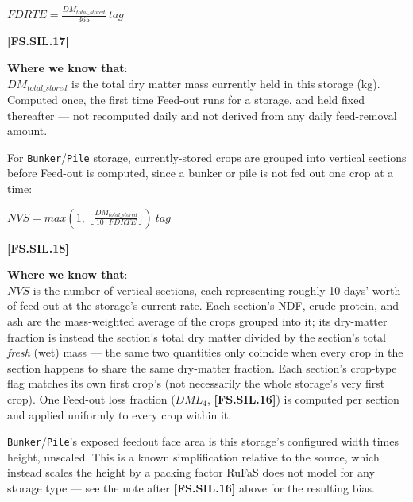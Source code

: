\begin{refsection}
        \begin{center}
        \(FDRTE = \frac{DM_{total\_stored}}{365}\ tag\)
    \end{center}
        \vspace{0.5cm}

            {\raggedleft \textbf{[FS.SIL.17]}\par}
        \vspace{0.5cm}

\textbf{Where we know that}: \\ \(DM_{total\_stored}\) is the total dry matter mass currently held in
this storage (kg). Computed once, the first time Feed-out runs for a storage, and held fixed
thereafter — not recomputed daily and not derived from any daily feed-removal amount.
\vspace{0.2cm}

For \texttt{Bunker}/\texttt{Pile} storage, currently-stored crops are grouped into vertical sections
before Feed-out is computed, since a bunker or pile is not fed out one crop at a time:
\vspace{0.2cm}

        \begin{center}
        \(NVS = max(1,\ \lfloor \frac{DM_{total\_stored}}{10 \cdot FDRTE} \rfloor)\ tag\)
    \end{center}
        \vspace{0.5cm}

            {\raggedleft \textbf{[FS.SIL.18]}\par}
        \vspace{0.5cm}

\textbf{Where we know that}: \\ \(NVS\) is the number of vertical sections, each representing roughly
10 days' worth of feed-out at the storage's current rate. Each section's NDF, crude protein, and ash
are the mass-weighted average of the crops grouped into it; its dry-matter fraction is instead the
section's total dry matter divided by the section's total \emph{fresh} (wet) mass — the same two
quantities only coincide when every crop in the section happens to share the same dry-matter fraction.
Each section's crop-type flag matches its own first crop's (not necessarily the whole storage's very
first crop). One Feed-out loss fraction (\(DML_4\), \textbf{[FS.SIL.16]}) is computed per section and
applied uniformly to every crop within it.
\vspace{0.2cm}

\texttt{Bunker}/\texttt{Pile}'s exposed feedout face area is this storage's configured width times
height, unscaled. This is a known simplification relative to the source, which instead scales the
height by a packing factor RuFaS does not model for any storage type — see the note after
\textbf{[FS.SIL.16]} above for the resulting bias.


\end{refsection}
